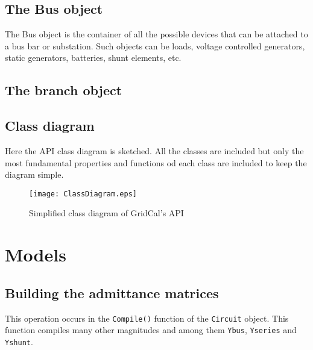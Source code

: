 \documentclass[11pt,fleqn]{book} %
\begin{document}
\section{The Bus object}

The Bus object is the container of all the possible devices that can be attached to a bus bar or substation. Such objects can be loads, voltage controlled generators, static generators, batteries, shunt elements, etc.

\section{The branch object}


\section{Class diagram}

Here the API class diagram is sketched. All the classes are included but only the most fundamental properties and functions od each class are included to keep the diagram simple.

\begin{figure}[h]
	\centering
	\texttt{[image: ClassDiagram.eps]}
	\caption{Simplified class diagram of GridCal's API}
	\label{fig:ClassDiagram}
\end{figure}


\chapter{Models}



\section{Building the admittance matrices}

This operation occurs in the \verb|Compile()| function of the \verb|Circuit| object. This function compiles many other magnitudes and among them \verb|Ybus|, \verb|Yseries| and \verb|Yshunt|.
\end{document}
